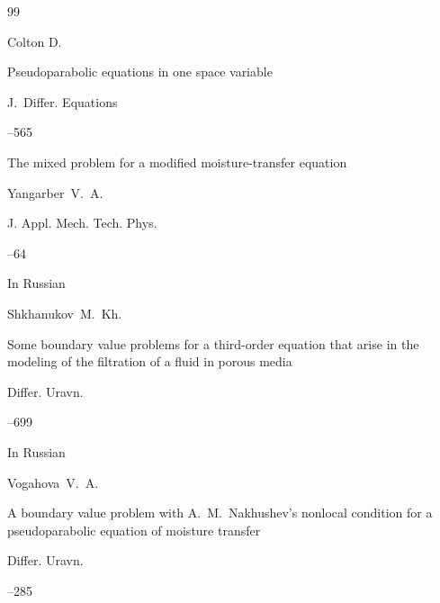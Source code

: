 \begin{thebibliography}{99}

\by Colton D.

\paper Pseudoparabolic equations in one space variable

\jour J.~Differ. Equations




--565


		


\paper The mixed problem for a modified moisture-transfer equation

\by Yangarber~V.~A.

\jour J. Appl. Mech. Tech. Phys.




–64 





\lang In Russian

\by Shkhanukov~M.~Kh.

\paper Some boundary value problems for a third-order equation that arise in the modeling of the filtration of a fluid in porous media

\jour Differ. Uravn.




--699






\lang In Russian

\by Vogahova~V.~A.

\paper A boundary value problem with A.~M.~Nakhushev's nonlocal condition for a pseudoparabolic equation of moisture transfer

\jour Differ. Uravn.




--285




\end{thebibliography}
